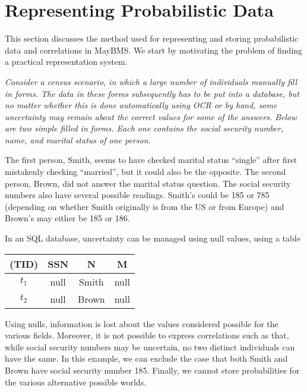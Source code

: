 \section{Representing Probabilistic Data}
\label{sect:representation}


This section discusses the method used for representing and storing probabilistic
data and correlations in MayBMS.
We start by motivating the problem of finding a practical representation system.


\begin{example}\em
\label{ex:census}
Consider a census scenario, in which a large number of individuals manually fill in forms.
The data in these forms subsequently has to be put into a database, but no matter whether this is done automatically using OCR or by hand, some uncertainty may remain about the correct values for some of the answers. Below are two simple filled in forms. Each one contains the
social security number, name, and marital status of one person.

\begin{center}
\end{center}

The first person, Smith, seems to have checked marital status ``single'' after first mistakenly checking ``married'', but it could also be the opposite.
%
%
The second person, Brown, did not answer the marital status question.
The social security numbers also have several possible readings. Smith's could be 185 or 785 (depending on whether Smith originally is from the US or from Europe) and Brown's may either be 185 or 186.

In an SQL database, uncertainty can be managed using null values, using a table
\begin{center}
\begin{tabular}{c|ccc}
\hline
(TID) & SSN & N & M \\
\hline
$t_1$ & null & Smith & null \\
$t_2$ & null & Brown & null \\
\end{tabular}
\end{center}

Using nulls, information is lost about the values considered possible for the various fields. Moreover, it is not possible to express correlations such as that, while social security numbers may be uncertain, no two distinct individuals can have the same. In this example, we can exclude the case that both Smith and Brown have social security number 185.
Finally, we cannot store probabilities for the various alternative possible worlds.
\punto
\end{example}


